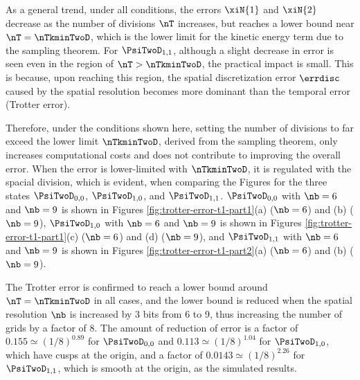\documentclass[manuscript_main.tex]{subfiles}
\begin{document}
As a general trend, under all conditions, the errors $\xiN{1}$ and $\xiN{2}$
decrease as the number of divisions $\nT$ increases, but reaches a lower bound
near $\nT = \nTkminTwoD$, which is the lower limit for the kinetic energy term due to the
sampling theorem. For $\PsiTwoD_{1,1}$, although a slight decrease in error is
seen even in the region of $\nT > \nTkminTwoD$, the practical impact is small.
This is because, upon reaching this region, the spatial discretization error
$\errdisc$ caused by the spatial resolution becomes more dominant than the
temporal error (Trotter error).

Therefore, under the conditions shown here, setting the
number of divisions to far exceed the lower limit $\nTkminTwoD$, derived from
the sampling theorem, only increases computational costs and does not contribute
to improving the overall error. When the error is lower-limited with
$\nTkminTwoD$, it is regulated with the spacial division, which is evident, when
comparing the Figures for the three states $\PsiTwoD_{0,0}$, $\PsiTwoD_{1,0}$, and
$\PsiTwoD_{1,1}$. $\PsiTwoD_{0,0}$ with $\nb=6$ and $\nb=9$ is shown in Figures
\ref{fig:trotter-error-t1-part1}(a) ($\nb=6$) and (b) ($\nb=9$),
$\PsiTwoD_{1,0}$ with $\nb=6$ and $\nb=9$ is shown in Figures
\ref{fig:trotter-error-t1-part1}(c) ($\nb=6$) and (d) ($\nb=9$), and
$\PsiTwoD_{1,1}$ with $\nb=6$ and $\nb=9$ is shown in Figures
\ref{fig:trotter-error-t1-part2}(a) ($\nb=6$) and (b) ($\nb=9$).

The Trotter error is confirmed to reach a lower bound around $\nT = \nTkminTwoD$ in all cases, and
the lower bound is reduced when the spatial resolution $\nb$ is increased by 3 bits
from 6 to 9, thus increasing the number of grids by a factor of 8.  The amount
of reduction of error is a factor of $0.155\simeq(1/8)^{0.89}$ for
$\PsiTwoD_{0,0}$ and $0.113\simeq(1/8)^{1.04}$ for $\PsiTwoD_{1,0}$, which have
cusps at the origin, and a factor of $0.0143\simeq(1/8)^{2.26}$ for
$\PsiTwoD_{1,1}$, which is smooth at the origin, as the simulated results.
\end{document}
